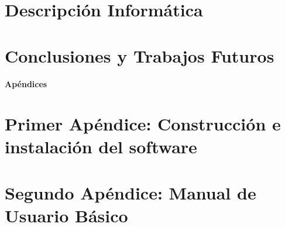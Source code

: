 \documentclass[11pt,twoside,titlepage]{report}
\begin{document}



\chapter{Descripción Informática}
\label{chap:descripcionInformatica}



\blankpage


\chapter{Conclusiones y Trabajos Futuros}
\label{chap:conclusiones}


\blankpage



{}

\footnotesize{
%


}



\raggedbottom
\afterpage{\blankpage}

\newpage





\appendix

{}

\mbox{}
\vfill
\begin{center}
\begin{Huge}
\textbf{Apéndices}
\end{Huge}
\end{center}
\vfill
\mbox{}
\thispagestyle{empty}

\newpage
\mbox{}
\thispagestyle{empty}
\newpage



\chapter{Primer Apéndice: Construcción e instalación del software}
\label{chap:apendiceConstruccion}


\chapter{Segundo Apéndice: Manual de Usuario Básico}
\label{chap:manualUsuario}



\end{document}
